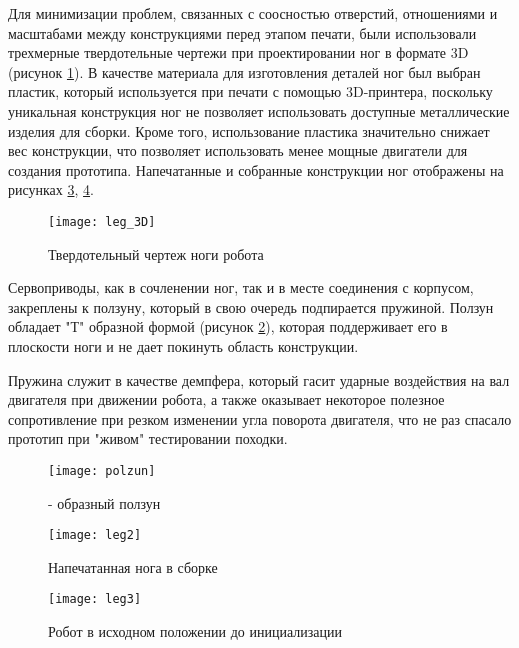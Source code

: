 Для минимизации проблем, связанных с соосностью отверстий, отношениями и масштабами между конструкциями перед этапом печати, были использовали трехмерные твердотельные чертежи при проектировании ног в формате 3D (рисунок \ref{leg_3D}). В качестве материала для изготовления деталей ног был выбран пластик, который используется при печати с помощью 3D-принтера, поскольку уникальная конструкция ног не позволяет использовать доступные металлические изделия для сборки. Кроме того, использование пластика значительно снижает вес конструкции, что позволяет использовать менее мощные двигатели для создания прототипа. Напечатанные и собранные конструкции ног отображены на рисунках \ref{leg2}, \ref{leg3}.
\begin{figure}[h!]
	\begin{center}
		\texttt{[image: leg\_3D]}
		\caption{Твердотельный чертеж ноги робота}
		\label{leg_3D}
	\end{center}
\end{figure}

Сервоприводы, как в сочленении ног, так и в месте соединения с корпусом, закреплены к ползуну, который в свою очередь подпирается пружиной. Ползун обладает "Т" \space образной формой (рисунок \ref{polzun}), которая поддерживает его в плоскости ноги и не дает покинуть область конструкции. 

Пружина служит в качестве демпфера, который гасит ударные воздействия на вал двигателя при движении робота, а также оказывает некоторое полезное сопротивление при резком изменении угла поворота двигателя, что не раз спасало прототип при "живом" \space тестировании походки.

\begin{figure}[h!]
	\begin{center}
		\texttt{[image: polzun]}
		\caption{ - образный ползун}
		\label{polzun}
	\end{center}
\end{figure}

\begin{figure}[h!]
	\begin{center}
		\texttt{[image: leg2]}
		\caption{Напечатанная нога в сборке}
		\label{leg2}
	\end{center}
\end{figure}

\begin{figure}[h!]
	\begin{center}
		\texttt{[image: leg3]}
		\caption{Робот в исходном положении до инициализации}
		\label{leg3}
	\end{center}
\end{figure}

